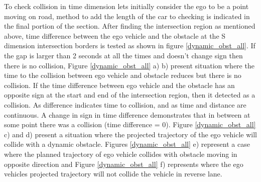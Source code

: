 To check collision in time dimension lets initially consider the ego to be a point moving on road, method to add the length of the car to checking is indicated in the final portion of the section. After finding the intersection region as mentioned above, time difference between the ego vehicle and the obstacle at the S dimension intersection borders is tested as shown in figure \ref{dynamic_obst_all}. If the gap is larger than 2 seconds at all the times and doesn't change sign then there is no collision, Figure \ref{dynamic_obst_all} a) b) present situation where the time to the collision between ego vehicle and obstacle reduces but there is no collision. If the time difference between ego vehicle and the obstacle has an opposite sign at the start and end of the intersection region, then it detected as a collision. As difference indicates time to collision, and as time and distance are continuous. A change in sign in time difference demonstrates that in between at some point there was a collision (time difference = 0). Figure \ref{dynamic_obst_all} c) and d) present a situation where the projected trajectory of the ego vehicle will collide with a dynamic obstacle. Figures \ref{dynamic_obst_all} e) represent a case where the planned trajectory of ego vehicle collides with obstacle moving in opposite direction and Figure \ref{dynamic_obst_all} f) represents where the ego vehicles projected trajectory will not collide the vehicle in reverse lane.


